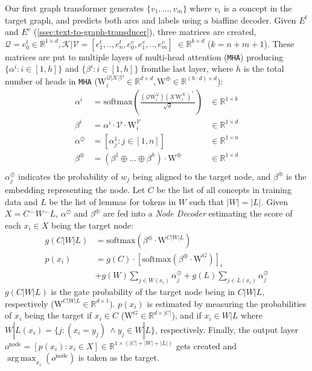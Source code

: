 \documentclass[11pt,a4paper]{article}
\newcommand{\LN}{\linebreak\noindent}    \newcommand{\textsec}[1]{\textsection\ref{#1}}
\DeclareMathOperator*{\argmax}{arg\,max}
\begin{document}
Our first graph transformer generates $\{v_1, \ldots, v_m\}$ where $v_i$ is a concept in the target graph, and predicts both arcs and labels using a biaffine decoder.
Given $E^t$ and $E^v$ (\textsec{ssec:text-to-graph-transducer}), three matrices are created, $\mathcal{Q} = e^t_0 \in \mathbb{R}^{1 \times d}, \mathcal{K}|\mathcal{V} = [e^t_1, .., e^t_n, e^v_0, e^v_1, .., e^v_m]$ $\in \mathbb{R}^{k \times d}$ ($k = n + m + 1$).
These matrices are put to multiple layers of multi-head attention (\texttt{MHA}) producing $\{\alpha^i : i \in [1, h]\}$ and $\{\beta^i : i \in [1, h]\}$ from\LN the last layer, where $h$ is the total number of heads in \texttt{MHA} ($\text{W}^{\mathcal{Q}|\mathcal{K}|\mathcal{V}}_i \in \mathbb{R}^{d \times d}, \text{W}^\oplus \in \mathbb{R}^{(h\cdot d) \times d}$):
\begin{align*}
\alpha^i &= \text{softmax}(\frac{(\mathcal{Q}\text{W}^\mathcal{Q}_i)(\mathcal{K}\text{W}^\mathcal{K}_i)^\top}{\sqrt{d}}) &\in\mathbb{R}^{1\times k}\\
\beta^i &= \alpha^i \cdot \mathcal{V} \cdot \text{W}^\mathcal{V}_i &\in \mathbb{R}^{1\times d}\\
\alpha^\oslash &= [\alpha^1_j : j \in [1, n]] &\in \mathbb{R}^{1 \times n} \\
\beta^\oplus &= (\beta^1 \oplus \ldots \oplus \beta^h) \cdot \text{W}^\oplus &\in \mathbb{R}^{1\times d}\\
\end{align*}
$\alpha^\oslash_j$ indicates the probability of $w_j$ being aligned to the target node, and $\beta^\oplus$ is the embedding representing the node.
Let $C$ be the list of all concepts in training data and $L$ be the list of lemmas for tokens in $W$ such that $|W| = |L|$.
Given $X = C^\frown W^\frown L$, $\alpha^\oslash$ and $\beta^\oplus$ are fed into a \textit{Node Decoder} estimating the score of each  $x_i \in X$ being the target node:
\begin{align*}
g(C|W|L) &= \text{softmax}(\beta^\oplus \cdot \text{W}^{C|W|L})\\
p(x_i)   &= g(C) \cdot [\text{softmax}(\beta^\oplus \cdot \text{W}^G)]_i\\
         &+ g(W) \sum_{j \in W(x_i)} \alpha^\oslash_j + g(L) \sum_{j \in L(x_i)} \alpha^\oslash_j
\end{align*}
$g(C|W|L)$ is the gate probability of the target node being in $C|W|L$, respectively ($\text{W}^{C|W|L} \in \mathbb{R}^{d \times 1}$).
$p(x_i)$ is estimated by measuring the probabilities of $x_i$ being the target if $x_i \in C$ ($\text{W}^G \in \mathbb{R}^{d \times |C|}$), and if $x_i \in W|L$ where $W|L(x_i) = \{j : (x_i = y_j)\:\land y_j \in W|L\}$, respectively.
Finally, the output layer\LN $o^{\text{node}} = [p(x_i) : x_i \in X] \in \mathbb{R}^{1 \times (|C|+|W|+|L|)}$ gets created and $\argmax_{x_i}(o^{\text{node}})$ is taken as the target.
\end{document}

